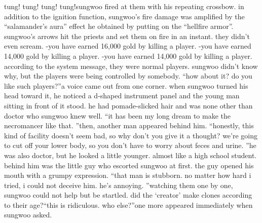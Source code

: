 tung! tung! tung! tung!sungwoo fired at them with his repeating crossbow.
 in addition to the ignition function, sungwoo’s fire damage was amplified by the “salamander’s aura” effect he obtained by putting on the “hellfire armor”.
sungwoo’s arrows hit the priests and set them on fire in an instant.
 they didn’t even scream.
-you have earned 16,000 gold by killing a player.
-you have earned 14,000 gold by killing a player.
-you have earned 14,000 gold by killing a player.
according to the system message, they were normal players.
sungwoo didn’t know why, but the players were being controlled by somebody.
“how about it? do you like such players?”a voice came out from one corner.
 when sungwoo turned his head toward it, he noticed a d-shaped instrument panel and the young man sitting in front of it stood.
 he had pomade-slicked hair and was none other than doctor who sungwoo knew well.
“it has been my long dream to make the necromancer like that.
”then, another man appeared behind him.
“honestly, this kind of facility doesn’t seem bad, so why don’t you give it a thought? we’re going to cut off your lower body, so you don’t have to worry about feces and urine.
”he was also doctor, but he looked a little younger.
 almost like a high school student.
behind him was the little guy who escorted sungwoo at first.
the guy opened his mouth with a grumpy expression.
“that man is stubborn.
 no matter how hard i tried, i could not deceive him.
 he’s annoying.
”watching them one by one, sungwoo could not help but be startled.
 did the ‘creator’ make clones according to their age?“this is ridiculous.
 who else?”one more appeared immediately when sungwoo asked.

